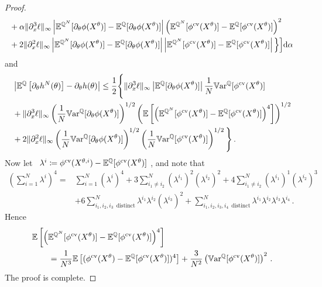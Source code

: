 \begin{proof}
\[\begin{split}
 	 & + \alpha\| \partial_x^3 \ell\|_{\infty}
 	 \left| \mathbb{E}^{\mathbb{Q}^N}[\partial_\theta \phi(X^{\theta})] - \mathbb{E}^{\mathbb{Q}}[\partial_\theta \phi(X^{\theta})] \right|
 	   \left(\mathbb{E}^{\mathbb{Q}^N}[\phi^{\textup{cv}}(X^{\theta})]  - \mathbb{E}^{\mathbb{Q}}[\phi^{\textup{cv}}(X^{\theta})]  \right)^2 \\
 & + 2 \| \partial_x^2 \ell\|_{\infty}  \left| \mathbb{E}^{\mathbb{Q}^N}[\partial_{\theta}\phi(X^{\theta})]  - \mathbb{E}^{\mathbb{Q}}[\partial_{\theta}\phi(X^{\theta})]  \right|\left|\mathbb{E}^{\mathbb{Q}^N}[\phi^{\textup{cv}}(X^{\theta})]  - \mathbb{E}^{\mathbb{Q}}[\phi^{\textup{cv}}(X^{\theta})] \right|\Big\} \Big]\mathrm{d}\alpha\,
 \end{split}
 \]
and
 \[
 \begin{split}
 &\left| \mathbb{E}^{\mathbb{Q}}\left[\partial_{\theta} h^{N}(\theta)\right] -  \partial_{\theta}h(\theta) \right| \leq \frac{1}{2}  \Bigg\{ \| \partial_x^3 \ell\|_{\infty}  \left| \mathbb{E}^{\mathbb{Q}}[\partial_\theta \phi(X^{\theta})]\right|
 \frac{1}{N}\mathbb{V}\mathrm{ar}^{\mathbb{Q}}[\phi^{\textup{cv}}(X^{\theta})] \\
 	 & + \| \partial_x^3 \ell\|_{\infty}
 	  \left( \frac{1}{N}\mathbb{V}\mathrm{ar}^{\mathbb{Q}}[\partial_\theta \phi(X^{\theta})]\right)^{1/2}
 	   \left( \mathbb{E} \left[ \left(\mathbb{E}^{\mathbb{Q}^N}[\phi^{\textup{cv}}(X^{\theta})]  - \mathbb{E}^{\mathbb{Q}}[\phi^{\textup{cv}}(X^{\theta})]  \right)^4 \right] \right)^{1/2} \\
 & + 2 \| \partial_x^2 \ell\|_{\infty}  \left( \frac{1}{N} \mathbb{V}\mathrm{ar} ^{\mathbb{Q}}[\partial_{\theta}\phi(X^{\theta})]   \right)^{1/2}\left( \frac{1}{N} \mathbb{V}\mathrm{ar} ^{\mathbb{Q}}[\phi^{\textup{cv}}(X^{\theta})] \right)^{1/2}\Bigg\}\,.
 \end{split}
 \]
Now let ~$\lambda^i\coloneqq \phi^{\textup{cv}}(X^{\theta,i}) - \mathbb{E}^{\mathbb{Q}}[\phi^{\textup{cv}}(X^{\theta})]~$, and note that
 \[
 \begin{split}
\left( \sum_{i=1}^N \lambda^i \right)^4 
 =& \sum_{i=1}^N (\lambda^i )^4 + 3 \sum_{i_1\neq i_2}^N (\lambda^{i_1} )^2 (\lambda^{i_2} )^2
+ 4 \sum_{i_1\neq i_2 }^N (\lambda^{i_1} )^1 (\lambda^{i_2} )^3 \\
&+ 6 \sum_{i_1, i_2, i_3\,\,\,  \text{distinct} }^N \lambda^{i_1} \lambda^{i_2} (\lambda^{i_3} )^2
+ \sum_{i_1, i_2, i_3,i_4 \,\,\,\text{distinct} }^N \lambda^{i_1} \lambda^{i_2}\lambda^{i_3}\lambda^{i_4}\,. 
\end{split}
 \]
Hence
\begin{align*}
&\mathbb{E} \left[ \left(\mathbb{E}^{\mathbb{Q}^N}[\phi^{\textup{cv}}(X^{\theta})]  - \mathbb{E}^{\mathbb{Q}}[\phi^{\textup{cv}}(X^{\theta})]  \right)^4 \right] \\
&\qquad = \frac{1}{N^3} \mathbb{E}\left[(\phi^{\textup{cv}}(X^{\theta}) - \mathbb{E}^{\mathbb{Q}}[\phi^{\textup{cv}}(X^{\theta})])^4\right]  +  \frac{3}{N^2} \left(\mathbb{V}\mathrm{ar} ^{\mathbb{Q}}[\phi^{\textup{cv}}(X^{\theta})]\right)^2\,. 
\end{align*}
The proof is complete.  
\end{proof}


